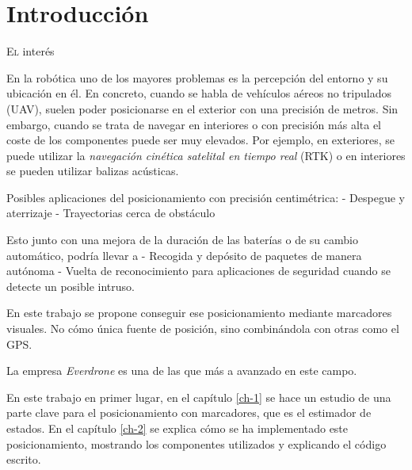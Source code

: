 \chapter{Introducción}\label{chp-02}

\lettrine[lraise=-0.1, lines=2, loversize=0.2]{E}{l} interés 

En la robótica uno de los mayores problemas es la percepción del entorno y su ubicación en él. En concreto, cuando se habla de vehículos aéreos no tripulados (UAV), suelen poder posicionarse en el exterior con una precisión de metros. Sin embargo, cuando se trata de navegar en interiores o con precisión más alta el coste de los componentes puede ser muy elevados. Por ejemplo, en exteriores, se puede utilizar la \textit{navegación cinética satelital en tiempo real} (RTK) o en interiores se pueden utilizar balizas acústicas.



Posibles aplicaciones del posicionamiento con precisión centimétrica:
- Despegue y aterrizaje
- Trayectorias cerca de obstáculo

Esto junto con una mejora de la duración de las baterías o de su cambio automático, podría llevar a
- Recogida y depósito de paquetes de manera autónoma
- Vuelta de reconocimiento para aplicaciones de seguridad cuando se detecte un posible intruso.


En este trabajo se propone conseguir ese posicionamiento mediante marcadores visuales. No cómo única fuente de posición, sino combinándola con otras como el GPS.



La empresa \textit{Everdrone} es una de las que más a avanzado en este campo. 

En este trabajo en primer lugar, en el capítulo \ref{ch-1} se hace un estudio de una parte clave para el posicionamiento con marcadores, que es el estimador de estados.  
En el capítulo \ref{ch-2} se explica cómo se ha implementado este posicionamiento, mostrando los componentes utilizados y explicando el código escrito.


\endinput
